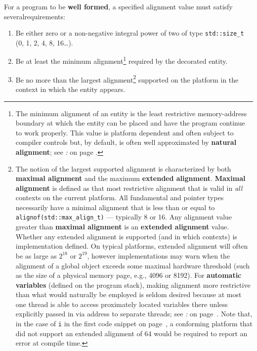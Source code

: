 \noindent For a program to be \textbf{well formed}, a specified alignment value
must satisfy several\linebreak[4] \mbox{requirements}:

\begin{enumerate}
\item{Be either zero or a non-negative integral power of two of type \texttt{std::size\_t} (0, 1, 2, 4, 8, 16\dots).}
\item{Be at least the minimum alignment\cprotect\footnote{The minimum alignment of an entity is the least restrictive memory-address boundary at which the entity can be placed and have the program continue to work properly. This value is platform dependent and often subject to compiler controls but, by default, is often well approximated by \textbf{natural alignment}; see \textit{: } on page \pageref{natural-alignment}.} required by the decorated entity.}
\item{Be no more than the largest alignment\cprotect\footnote{The notion of the largest supported alignment is characterized by both \textbf{maximal alignment} and the maximum \textbf{extended alignment}. \textbf{Maximal alignment} is defined as that most restrictive alignment that is valid in \emph{all} contexts on the current platform. All fundamental and pointer types necessarily have a minimal alignment that is less than or equal to \texttt{alignof(std::max\_align\_t)} — typically 8 or 16. Any alignment value greater than \textbf{maximal alignment} is an \textbf{extended alignment} value. Whether any extended alignment is supported (and in which contexts) is implementation defined. On typical platforms, extended alignment will often be as large as $2^{18}$ or $2^{19}$, however implementations may warn when the alignment of a global object exceeds some maximal hardware threshold (such as the size of a physical memory page, e.g., 4096 or 8192). For \textbf{automatic variables} (defined on the program stack), making alignment more restrictive than what would naturally be employed  is seldom desired because at most one thread is able to access proximately located variables there unless explicitly passed in via address to separate threads; see \textit{: } on page~\pageref{avoiding-false-sharing-among-distinct-objects-in-a-multi-threaded-program}. Note that, in the case of \texttt{i} in the first code snippet on page~\pageref{restricting-the-alignment-of-a-particular-object}, a conforming platform that did not support an extended alignment of 64 would be required to report an error at compile time.} supported on the platform in the context in which the entity appears.}
\end{enumerate}

